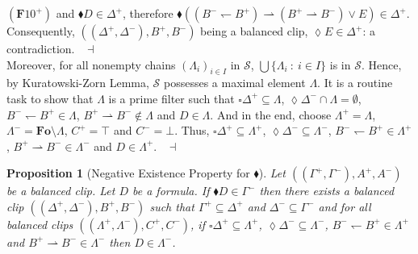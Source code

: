 \documentclass[draft]{article}
\newtheorem{proposition}{Proposition}
\newenvironment{proof}{{\bf Proof:}}{~$\dashv$\\}
\def\Formula{\mathbf{A}}
\def\Formula{\mathbf{F}}
\def\Fo{\mathbf{Fo}}
\begin{document}
\begin{proof}
\begin{proof}
%
\linebreak$
%
%
%
%
%
%
(\Formula10^{+})$ and ${\blacklozenge}D{\in}\Delta^{+}$, therefore ${\blacklozenge}((B^{-}{\leftharpoondown}B^{+}){\rightharpoonup}(B^{+}{\rightharpoonup}B^{-}){\vee}E){\in}\Delta^{+}$.
Consequent\-ly, $((\Delta^{+},\Delta^{-}),B^{+},B^{-})$ being a balanced clip, ${\lozenge}E{\in}\Delta^{+}$: a contradiction.
%
%
\medskip
%
%
\end{proof}
%
%
Moreover, for all nonempty chains $(\Lambda_{i})_{i{\in}I}$ in ${\mathcal S}$, $\bigcup\{\Lambda_{i}\ :\ i{\in}I\}$ is in ${\mathcal S}$.
Hence, by Kuratowski-Zorn Lemma, ${\mathcal S}$ possesses a maximal element $\Lambda$.
It is a routine task to show that $\Lambda$ is a prime filter such that ${\square}\Delta^{+}{\subseteq}\Lambda$, ${\lozenge}\Delta^{-}{\cap}\Lambda{=}\emptyset$, $B^{-}{\leftharpoondown}B^{+}{\in}\Lambda$, $B^{+}{\rightharpoonup}B^{-}
%
%
%
%
%
%
%
$\linebreak$
%
%
%
%
%
%
{\not\in}\Lambda$ and $D{\in}\Lambda$.
And in the end, choose $\Lambda^{+}{=}\Lambda$, $\Lambda^{-}{=}\Fo{\setminus}\Lambda$, $C^{+}{=}{\top}$ and $C^{-}{=}{\bot}$.
Thus, ${\square}\Delta^{+}{\subseteq}\Lambda^{+}$, ${\lozenge}\Delta^{-}{\subseteq}\Lambda^{-}$, $B^{-}{\leftharpoondown}B^{+}{\in}\Lambda^{+}$, $B^{+}{\rightharpoonup}B^{-}{\in}\Lambda^{-}$ and $D{\in}\Lambda^{+}$.
%
%
\medskip
%
%
\end{proof}
%
%
\begin{proposition}[Negative Existence Property for $\blacklozenge$]\label{Proposition:let:be:a:balanced:clip:let:be:a:formula:if:then:there:exists:a:balanced:clip:such:that:and:and:for:all:balanced:clips:if:and:then:1}
%
%
Let $((\Gamma^{+},\Gamma^{-}),A^{+},A^{-})$ be a
%
%
%
%
%
%
%
\linebreak
%
%
%
%
%
%
balanced clip.
Let $D$ be a formula.
If ${\blacklozenge}D{\in}\Gamma^{-}$ then there exists a balanced clip $((\Delta^{+},\Delta^{-}),B^{+},B^{-})$ such that $\Gamma^{+}{\subseteq}\Delta^{+}$ and $\Delta^{-}{\subseteq}\Gamma^{-}$ and for all balanced clips $((\Lambda^{+},\Lambda^{-}),C^{+},C^{-})$, if ${\square}\Delta^{+}{\subseteq}\Lambda^{+}$, ${\lozenge}\Delta^{-}{\subseteq}\Lambda^{-}$, $B^{-}{\leftharpoondown}B^{+}{\in}\Lambda^{+}$ and $B^{+}{\rightharpoonup}B^{-}{\in}\Lambda^{-}$ then $D{\in}\Lambda^{-}$.
%
%
\end{proposition}
%
%
\end{document}
